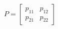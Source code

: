 \documentclass[preview]{standalone}
\begin{document}
\begin{align*}
P = \begin{bmatrix} p_{11} & p_{12} \\ p_{21} & p_{22} \end{bmatrix}
\end{align*}
\end{document}
